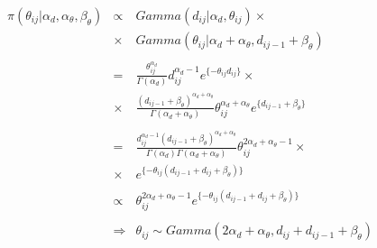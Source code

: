 \begin{eqnarray*}
\pi(\theta_{ij}|\alpha_d,\alpha_\theta,\beta_\theta)&\propto& Gamma(d_{ij}|\alpha_d,\theta_{ij})\times\\ &\times& Gamma(\theta_{ij}|\alpha_d+\alpha_\theta,d_{ij-1}+\beta_\theta)\\
\\
&=&\frac{\theta_{ij}^{\alpha_d}}{\Gamma(\alpha_d)} d_{ij}^{\alpha_d-1} e^{\{-\theta_{ij} d_{ij}\}}\times\\      &\times& \frac{(d_{ij-1}+\beta_\theta)^{\alpha_d+\alpha_\theta}}{\Gamma(\alpha_d+\alpha_\theta)}\theta_{ij}^{\alpha_d+\alpha_\theta}e^{\{d_{ij-1}+\beta_\theta\}}\\
\\
&=&\frac{d_{ij}^{\alpha_d-1}(d_{ij-1}+\beta_\theta)^{\alpha_d+\alpha_\theta}}{\Gamma(\alpha_d)\Gamma(\alpha_d+\alpha_\theta)} \theta_{ij}^{2\alpha_d+\alpha_\theta-1}\times \\
&\times& e^{\{-\theta_{ij}(d_{ij-1}+d_{ij}+\beta_\theta)\}}\\
\\
&\propto& \theta_{ij}^{2\alpha_d+\alpha_\theta-1}e^{\{-\theta_{ij}(d_{ij-1}+d_{ij}+\beta_\theta)\}}\\
\\
&\Rightarrow& \theta_{ij} \sim Gamma(2\alpha_d+\alpha_\theta,d_{ij}+d_{ij-1}+\beta_\theta)
\end{eqnarray*}
